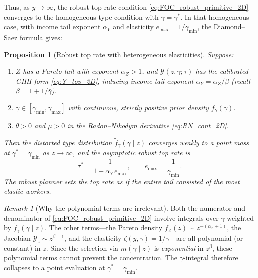 \documentclass[12pt,a4paper]{article}
\theoremstyle{definition}
\theoremstyle{plain}
\newtheorem{proposition}{Proposition}[section]
\theoremstyle{remark}
\newtheorem{remark}{Remark}[section]
\newcommand{\calY}{\mathcal{Y}}
\begin{document}
Thus, as $y \to \infty$, the robust top-rate condition \eqref{eq:FOC_robust_primitive_2D} converges to the homogeneous-type condition with $\gamma = \gamma^*$.  In that homogeneous case, with income tail exponent $\alpha_Y$ and elasticity $e_{\max} = 1/\gamma_{\min}$, the Diamond--Saez formula gives:

\begin{proposition}[Robust top rate with heterogeneous elasticities]
\label{prop:robust_top_2D}
Suppose:
\begin{enumerate}[label=(\roman*)]
  \item $Z$ has a Pareto tail with exponent $\alpha_Z > 1$, and $\calY(z,\gamma;\tau)$ has the calibrated GHH form \eqref{eq:Y_top_2D}, inducing income tail exponent $\alpha_Y = \alpha_Z/\beta$ (recall $\beta = 1+1/\bar\gamma$).
  \item $\gamma \in [\gamma_{\min},\gamma_{\max}]$ with continuous, strictly positive prior density $f_{\gamma}(\gamma)$.
  \item $\theta > 0$ and $\mu > 0$ in the Radon--Nikodym derivative \eqref{eq:RN_cont_2D}.
\end{enumerate}
Then the distorted type distribution $\widetilde{f}_{\gamma}(\gamma \mid z)$ converges weakly to a point mass at $\gamma^* = \gamma_{\min}$ as $z \to \infty$, and the asymptotic robust top rate is
\begin{equation}
\label{eq:robust_top_2D}
  \tau^* = \frac{1}{1 + \alpha_Y\,e_{\max}}, \qquad e_{\max} = \frac{1}{\gamma_{\min}}.
\end{equation}
The robust planner sets the top rate as if the entire tail consisted of the most elastic workers.
\end{proposition}

\begin{remark}[Why the polynomial terms are irrelevant]
\label{rem:polynomial_2D}
Both the numerator and denominator of \eqref{eq:FOC_robust_primitive_2D} involve integrals over $\gamma$ weighted by $\widetilde{f}_{\gamma}(\gamma \mid z)$.  The other terms---the Pareto density $f_Z(z) \sim z^{-(\alpha_Z+1)}$, the Jacobian $\calY_z \sim z^{\beta-1}$, and the elasticity $\zeta(y,\gamma) = 1/\gamma$---are all polynomial (or constant) in $z$.  Since the selection via $m(\gamma \mid z)$ is \emph{exponential} in $z^{\beta}$, these polynomial terms cannot prevent the concentration.  The $\gamma$-integral therefore collapses to a point evaluation at $\gamma^* = \gamma_{\min}$.
\end{remark}
\end{document}
